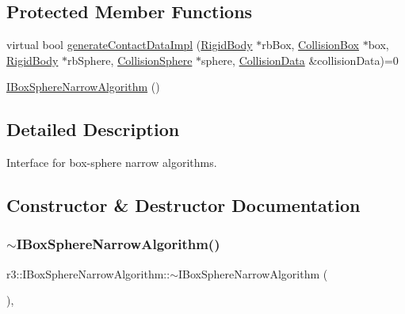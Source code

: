 \subsection*{Protected Member Functions}
\begin{DoxyCompactItemize}
\item 
virtual bool \mbox{\hyperlink{classr3_1_1_i_box_sphere_narrow_algorithm_af28bcda3eb527a6ee48a3b624e5d47e0}{generate\+Contact\+Data\+Impl}} (\mbox{\hyperlink{classr3_1_1_rigid_body}{Rigid\+Body}} $\ast$rb\+Box, \mbox{\hyperlink{classr3_1_1_collision_box}{Collision\+Box}} $\ast$box, \mbox{\hyperlink{classr3_1_1_rigid_body}{Rigid\+Body}} $\ast$rb\+Sphere, \mbox{\hyperlink{classr3_1_1_collision_sphere}{Collision\+Sphere}} $\ast$sphere, \mbox{\hyperlink{classr3_1_1_collision_data}{Collision\+Data}} \&collision\+Data)=0
\item 
\mbox{\hyperlink{classr3_1_1_i_box_sphere_narrow_algorithm_ab8b57aa1583fb467fb06998487b2a5a6}{I\+Box\+Sphere\+Narrow\+Algorithm}} ()
\end{DoxyCompactItemize}


\subsection{Detailed Description}
Interface for box-\/sphere narrow algorithms. 

\subsection{Constructor \& Destructor Documentation}
\mbox{\label{classr3_1_1_i_box_sphere_narrow_algorithm_ac70f8e99bb2deb52c1e4686ef6fafe2d}} 
\subsubsection{\texorpdfstring{$\sim$\+I\+Box\+Sphere\+Narrow\+Algorithm()}{~IBoxSphereNarrowAlgorithm()}}
{\footnotesize\ttfamily r3\+::\+I\+Box\+Sphere\+Narrow\+Algorithm\+::$\sim$\+I\+Box\+Sphere\+Narrow\+Algorithm (\begin{DoxyParamCaption}{ }\end{DoxyParamCaption})\hspace{0.3cm}{\ttfamily [virtual]}, {\ttfamily [default]}}

